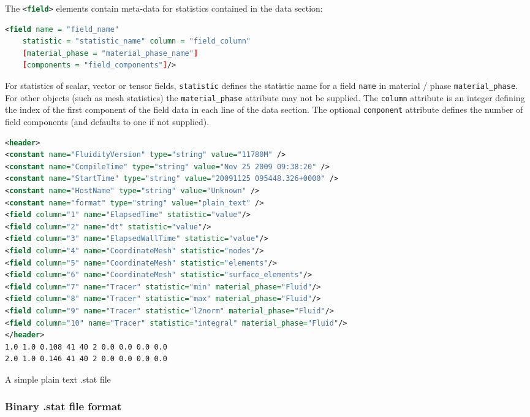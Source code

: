 The \lstinline[language = XML]*<field>* elements contain meta-data for statistics
contained in the data section:

\begin{lstlisting}[language = XML]
  <field name = "field_name"
    statistic = "statistic_name" column = "field_column"
    [material_phase = "material_phase_name"]
    [components = "field_components"]/>
\end{lstlisting}

For statistics of scalar, vector or tensor fields,
\lstinline[language = XML]*statistic* defines the statistic name for
a field \lstinline[language = XML]*name* in material / phase
\lstinline[language = XML]*material_phase*. For other objects (such as mesh
statistics) the \lstinline[language = XML]*material_phase* attribute may not
be supplied. The \lstinline[language = XML]*column* attribute is an integer defining the
index of the first component of the field data in each line of the data section.
The optional \lstinline[language = XML]*component* attribute defines the number
of field components (and defaults to one if not supplied).

\begin{example}
\begin{lstlisting}[language = XML]
<header>
<constant name="FluidityVersion" type="string" value="11780M" />
<constant name="CompileTime" type="string" value="Nov 25 2009 09:38:20" />
<constant name="StartTime" type="string" value="20091125 095448.326+0000" />
<constant name="HostName" type="string" value="Unknown" />
<constant name="format" type="string" value="plain_text" />
<field column="1" name="ElapsedTime" statistic="value"/>
<field column="2" name="dt" statistic="value"/>
<field column="3" name="ElapsedWallTime" statistic="value"/>
<field column="4" name="CoordinateMesh" statistic="nodes"/>
<field column="5" name="CoordinateMesh" statistic="elements"/>
<field column="6" name="CoordinateMesh" statistic="surface_elements"/>
<field column="7" name="Tracer" statistic="min" material_phase="Fluid"/>
<field column="8" name="Tracer" statistic="max" material_phase="Fluid"/>
<field column="9" name="Tracer" statistic="l2norm" material_phase="Fluid"/>
<field column="10" name="Tracer" statistic="integral" material_phase="Fluid"/>
</header>
1.0 1.0 0.108 41 40 2 0.0 0.0 0.0 0.0
2.0 1.0 0.146 41 40 2 0.0 0.0 0.0 0.0
\end{lstlisting}
\caption{A simple plain text .stat file}
\end{example}

\subsubsection{Binary .stat file format}

